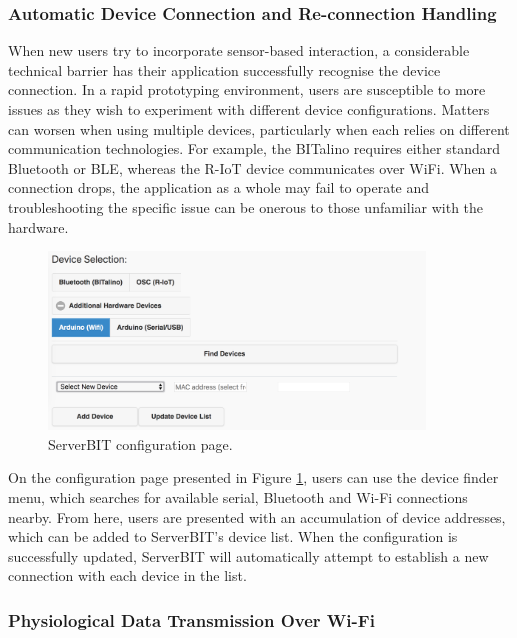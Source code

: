 \subsubsection*{Automatic Device Connection and Re-connection Handling}
When new users try to incorporate sensor-based interaction, a considerable technical barrier has their application successfully recognise the device connection. In a rapid prototyping environment, users are susceptible to more issues as they wish to experiment with different device configurations. Matters can worsen when using multiple devices, particularly when each relies on different communication technologies. For example, the BITalino requires either standard Bluetooth or BLE, whereas the R-IoT device communicates over WiFi. When a connection drops, the application as a whole may fail to operate and troubleshooting the specific issue can be onerous to those unfamiliar with the hardware.

\begin{figure}[htbp]
    \centering
    \includegraphics[width=100mm,scale=1.0]{Chapters/Figures/technical/ServerBIT/device_selection.png}
    \caption{ServerBIT configuration page.}
    \label{fig:dev_selection}
\end{figure}

On the configuration page presented in Figure \ref{fig:dev_selection}, users can use the device finder menu, which searches for available serial, Bluetooth and Wi-Fi connections nearby. From here, users are presented with an accumulation of device addresses, which can be added to ServerBIT's device list. When the configuration is successfully updated, ServerBIT will automatically attempt to establish a new connection with each device in the list.

\subsubsection*{Physiological Data Transmission Over Wi-Fi} \label{riot}

